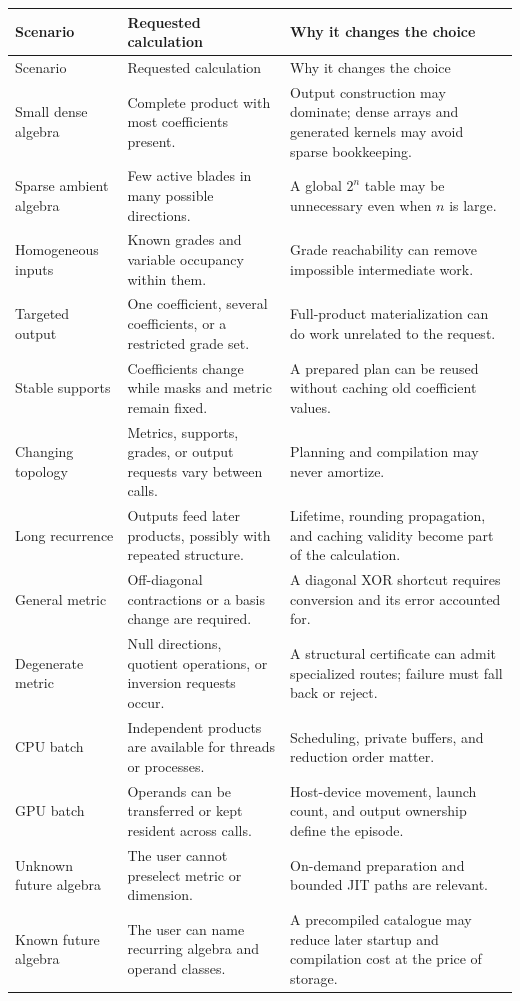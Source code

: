 \documentclass[11pt,a4paper]{article}
\begin{document}
\begin{longtable}{@{}p{31mm}p{61mm}p{59mm}@{}}
\toprule
Scenario & Requested calculation & Why it changes the choice\\
\midrule
\endfirsthead
\toprule
Scenario & Requested calculation & Why it changes the choice\\
\midrule
\endhead
Small dense algebra &
Complete product with most coefficients present. &
Output construction may dominate; dense arrays and generated kernels
may avoid sparse bookkeeping.\\
Sparse ambient algebra &
Few active blades in many possible directions. &
A global \(2^n\) table may be unnecessary even when \(n\) is large.\\
Homogeneous inputs &
Known grades and variable occupancy within them. &
Grade reachability can remove impossible intermediate work.\\
Targeted output &
One coefficient, several coefficients, or a restricted grade set. &
Full-product materialization can do work unrelated to the request.\\
Stable supports &
Coefficients change while masks and metric remain fixed. &
A prepared plan can be reused without caching old coefficient values.\\
Changing topology &
Metrics, supports, grades, or output requests vary between calls. &
Planning and compilation may never amortize.\\
Long recurrence &
Outputs feed later products, possibly with repeated structure. &
Lifetime, rounding propagation, and caching validity become part of
the calculation.\\
General metric &
Off-diagonal contractions or a basis change are required. &
A diagonal XOR shortcut requires conversion and its error accounted
for.\\
Degenerate metric &
Null directions, quotient operations, or inversion requests occur. &
A structural certificate can admit specialized routes; failure must
fall back or reject.\\
CPU batch &
Independent products are available for threads or processes. &
Scheduling, private buffers, and reduction order matter.\\
GPU batch &
Operands can be transferred or kept resident across calls. &
Host-device movement, launch count, and output ownership define the
episode.\\
Unknown future algebra &
The user cannot preselect metric or dimension. &
On-demand preparation and bounded JIT paths are relevant.\\
Known future algebra &
The user can name recurring algebra and operand classes. &
A precompiled catalogue may reduce later startup and compilation
cost at the price of storage.\\
\bottomrule
\end{longtable}
\end{document}
